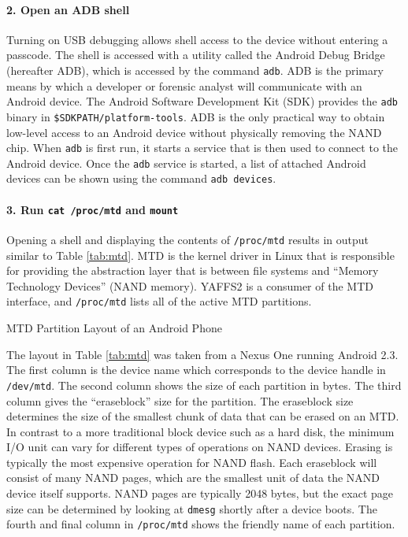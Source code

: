 \paragraph {2. Open an ADB shell}
Turning on USB debugging allows shell access to the device without entering a passcode. The shell is accessed with a utility called
the Android Debug Bridge (hereafter ADB), which is accessed by the command \texttt{adb}.  ADB is the primary means by which a
developer or forensic analyst will communicate with an Android device. The Android Software Development Kit (SDK) provides the
\texttt{adb} binary in \texttt{\$SDKPATH/platform-tools}.  ADB is the only practical way to obtain low-level access to an Android
device without physically removing the NAND chip.  When \texttt{adb} is first run, it starts a service that is then used to connect
to the Android device.  Once the \texttt{adb} service is started, a list of attached Android devices can be shown using the command
\texttt{adb devices}.

\paragraph {3. Run \texttt{cat /proc/mtd} and \texttt{mount}}
Opening a shell and displaying the contents of \texttt{/proc/mtd} results in output similar to Table \ref{tab:mtd}.  MTD is the
kernel driver in Linux that is responsible for providing the abstraction layer that is between file systems and ``Memory
Technology Devices'' (NAND memory). YAFFS2 is a consumer of the MTD interface, and \texttt{/proc/mtd} lists all of the active MTD
partitions. 
\begin{table}[htb]
\lstset{numbers=none}

\caption{MTD Partition Layout of an Android Phone}
\label{tab:mtd}
\end{table}	

The layout in Table \ref{tab:mtd} was taken from a Nexus One running Android 2.3.  The first column is the device name which
corresponds to the device handle in \texttt{/dev/mtd}.  The second column shows the size of each partition in bytes.  The third
column gives the ``eraseblock'' size for the partition.  The eraseblock size determines the size of the smallest chunk of data that
can be erased on an MTD. In contrast to a more traditional block device such as a hard disk, the minimum I/O unit can vary for
different types of operations on NAND devices. Erasing is typically the most expensive operation for NAND flash. Each eraseblock
will consist of many NAND pages, which are the smallest unit of data the NAND device itself supports.  NAND pages are typically 2048
bytes, but the exact page size can be determined by looking at \texttt{dmesg} shortly after a device boots.  The fourth and final
column in \texttt{/proc/mtd} shows the friendly name of each partition.  

